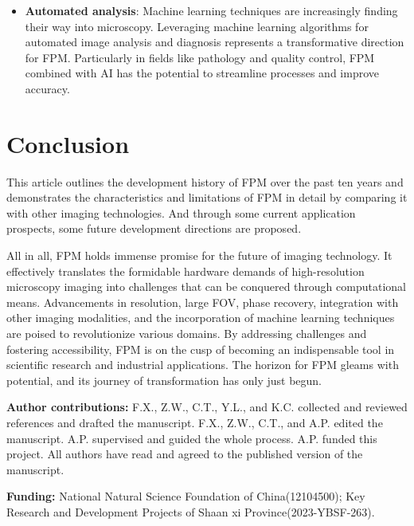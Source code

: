 \documentclass[journal,review,submit,pdftex,moreauthors]{Definitions/mdpi}
\begin{document}
\begin{itemize}
        \item \textbf{Automated analysis}: Machine learning techniques are increasingly finding their way into microscopy. Leveraging machine learning algorithms for automated image analysis and diagnosis represents a transformative direction for FPM. Particularly in fields like pathology and quality control, FPM combined with AI has the potential to streamline processes and improve accuracy.

\end{itemize}

\section{Conclusion}
This article outlines the development history of FPM over the past ten years and demonstrates the characteristics and limitations of FPM in detail by comparing it with other imaging technologies. And through some current application prospects, some future development directions are proposed.


All in all, FPM holds immense promise for the future of imaging technology. It effectively translates the formidable hardware demands of high-resolution microscopy imaging into challenges that can be conquered through computational means. Advancements in resolution, large FOV, phase recovery, integration with other imaging modalities, and the incorporation of machine learning techniques are poised to revolutionize various domains. By addressing challenges and fostering accessibility, FPM is on the cusp of becoming an indispensable tool in scientific research and industrial applications. The horizon for FPM gleams with potential, and its journey of transformation has only just begun.\\ \vspace{0.1em}


\noindent\textbf{Author contributions:} F.X., Z.W., C.T., Y.L., and K.C. collected and reviewed references and drafted the manuscript. F.X., Z.W., C.T., and A.P. edited the manuscript. A.P. supervised and guided the whole process. A.P. funded this project. All authors have read and agreed to the published version of the manuscript.\\ \vspace{-0.5em}

\noindent\textbf{Funding:} National Natural Science Foundation of China(12104500); Key Research and Development Projects of Shaan xi Province(2023-YBSF-263). \\ \vspace{-0.5em}
\end{document}
